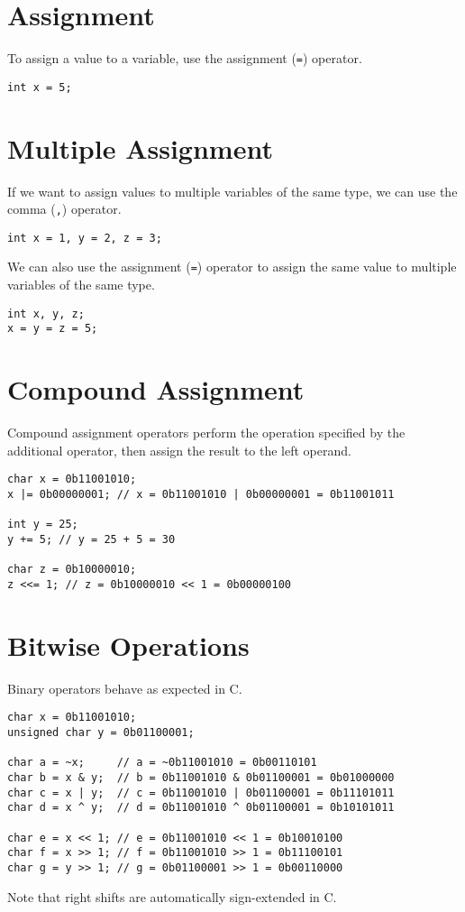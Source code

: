 \documentclass{report}
\begin{document}
\section{Assignment}
To assign a value to a variable, use the assignment (\texttt{=})
operator.
\begin{verbatim}
int x = 5;
\end{verbatim}
\section{Multiple Assignment}
If we want to assign values to multiple variables of the same type, we
can use the comma (\texttt{,}) operator.
\begin{verbatim}
int x = 1, y = 2, z = 3;
\end{verbatim}
We can also use the assignment (\texttt{=}) operator to assign
the same value to multiple variables of the same type.
\begin{verbatim}
int x, y, z;
x = y = z = 5;
\end{verbatim}
\section{Compound Assignment}
Compound assignment operators perform the operation specified by the
additional operator, then assign the result to the left operand.
\begin{verbatim}
char x = 0b11001010;
x |= 0b00000001; // x = 0b11001010 | 0b00000001 = 0b11001011

int y = 25;
y += 5; // y = 25 + 5 = 30

char z = 0b10000010;
z <<= 1; // z = 0b10000010 << 1 = 0b00000100
\end{verbatim}
\section{Bitwise Operations}
Binary operators behave as expected in C.
\begin{verbatim}
char x = 0b11001010;
unsigned char y = 0b01100001;

char a = ~x;     // a = ~0b11001010 = 0b00110101
char b = x & y;  // b = 0b11001010 & 0b01100001 = 0b01000000
char c = x | y;  // c = 0b11001010 | 0b01100001 = 0b11101011
char d = x ^ y;  // d = 0b11001010 ^ 0b01100001 = 0b10101011

char e = x << 1; // e = 0b11001010 << 1 = 0b10010100
char f = x >> 1; // f = 0b11001010 >> 1 = 0b11100101
char g = y >> 1; // g = 0b01100001 >> 1 = 0b00110000
\end{verbatim}
Note that right shifts are automatically sign-extended in C.
\end{document}

